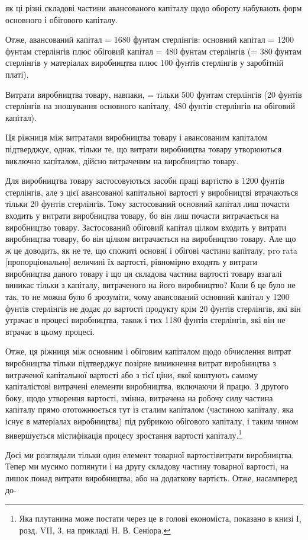 як ці різні складові частини авансованого капіталу щодо обороту
набувають форм основного і обігового капіталу.

Отже, авансований капітал = 1680 фунтам стерлінгів: основний
капітал = 1200 фунтам стерлінгів плюс обіговий капітал =
480 фунтам стерлінгів (= 380 фунтам стерлінгів у матеріалах
виробництва плюс 100 фунтів стерлінгів у заробітній платі).

Витрати виробництва товару, навпаки, = тільки 500 фунтам
стерлінгів (20 фунтів стерлінгів на зношування основного капіталу,
480 фунтів стерлінгів на обіговий капітал).

Ця ріжниця між витратами виробництва товару і авансованим
капіталом підтверджує, однак, тільки те, що витрати
виробництва товару утворюються виключно капіталом, дійсно
витраченим на виробництво товару.

Для виробництва товару застосовуються засоби праці вартістю
в 1200 фунтів стерлінгів, але з цієї авансованої капітальної
вартості у виробництві втрачаються тільки 20 фунтів
стерлінгів. Тому застосований основний капітал лиш почасти
входить у витрати виробництва товару, бо він лиш почасти
витрачається на виробництво товару. Застосований обіговий
капітал цілком входить у витрати виробництва товару, бо він
цілком витрачається на виробництво товару. Але що ж це доводить,
як не те, що спожиті основні і обігові частини капіталу,
pro rata [пропорціонально] величині їх вартості, рівномірно
входять у витрати виробництва даного товару і що ця складова
частина вартості товару взагалі виникає тільки з капіталу,
витраченого на його виробництво? Коли б це було не так, то
не можна було б зрозуміти, чому авансований основний капітал
у 1200 фунтів стерлінгів не додає до вартості продукту крім
20 фунтів стерлінгів, які він утрачає в процесі виробництва,
також і тих 1180 фунтів стерлінгів, які він не втрачає в цьому
процесі.

Отже, ця ріжниця між основним і обіговим капіталом щодо
обчислення витрат виробництва тільки підтверджує позірне
виникнення витрат виробництва з витраченої капітальної вартості
або з тієї ціни, якої коштують самому капіталістові витрачені
елементи виробництва, включаючи й працю. З другого
боку, щодо утворення вартості, змінна, витрачена на робочу
силу частина капіталу прямо ототожнюється тут із сталим капіталом
(частиною капіталу, яка існує в матеріалах виробництва)
під рубрикою обігового капіталу, і таким чином вивершується
містифікація процесу зростання вартості капіталу.\footnote{
Яка плутанина може постати через це в голові економіста, показано
в книзі І, розд. VII, 3, на прикладі Н. В. Сеніора.
}

Досі ми розглядали тільки один елемент товарної вартостівитрати
виробництва. Тепер ми мусимо поглянути і на другу
складову частину товарної вартості, на лишок понад витрати
виробництва, або на додаткову вартість. Отже, насамперед до-